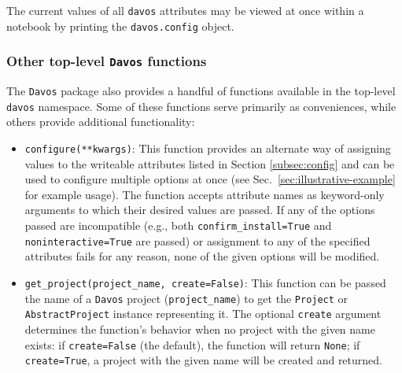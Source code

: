 \documentclass[preprint,12pt,a4paper]{elsarticle}
\begin{document}
\noindent The current values of all \texttt{davos} attributes may be viewed at once within a notebook by printing the \texttt{davos.config} object.


\subsubsection{Other top-level \texttt{Davos} functions}\label{subsec:toplevel}

The \texttt{Davos} package also provides a handful of functions available in the top-level \texttt{davos} namespace.
Some of these functions serve primarily as conveniences, while others provide additional functionality:

\begin{itemize}

\item \texttt{configure(**kwargs)}: This function provides an alternate way of assigning values to the writeable attributes listed in Section \ref{subsec:config} and can be used to configure multiple options at once (see Sec.~\ref{sec:illustrative-example} for example usage).
  The function accepts attribute names as keyword-only arguments to which their desired values are passed.
  If any of the options passed are incompatible (e.g., both \texttt{confirm\_install=True} and \texttt{noninteractive=True} are passed) or assignment to any of the specified attributes fails for any reason, none of the given options will be modified.

\item \texttt{get\_project(project\_name, create=False)}: This function can be passed the name of a \texttt{Davos} project (\texttt{project\_name}) to get the \texttt{Project} or \texttt{AbstractProject} instance representing it.
  The optional \texttt{create} argument determines the function's behavior when no project with the given name exists: if \texttt{create=False} (the default), the function will return \texttt{None}; if \texttt{create=True}, a project with the given name will be created and returned.


\end{itemize}
\end{document}
